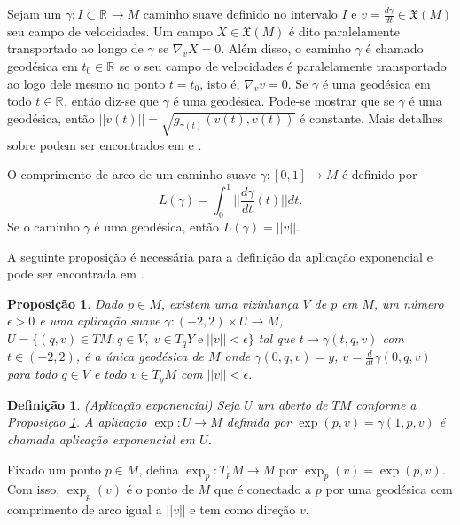 \documentclass[12pt]{book}
\newtheorem{definicao}[teorema]{Definição}
\newtheorem{proposicao}[teorema]{Proposição}
\newcommand{\campossuaves}[1]{\mathfrak{X}(#1)}
\newcommand{\derivada}[2]{\frac{d #1}{d #2}}
\newcommand{\espacotangenteponto}[2]{T_{#1}#2}
\newcommand{\intervalo}{[0,1]}
\newcommand{\norma}[1]{||#1||}
\newcommand{\normagrande}[1]{\Big|\Big|#1\Big|\Big|}
\newcommand{\real}[1]{\mathbb{R}^{#1}}
\newcommand{\reta}{\real{}}
\begin{document}
	Sejam um $\gamma:I\subset\reta\to M$ caminho suave definido no intervalo $I$ e $v=\derivada{\gamma}{t}\in \campossuaves{M}$ seu campo de velocidades. Um campo $X \in \campossuaves{M}$ é dito paralelamente transportado ao longo de $\gamma$ se $\nabla_{v}X=0$. Além disso, o caminho $\gamma$ é chamado geodésica em $t_{0} \in \reta$ se o seu campo de velocidades é paralelamente transportado ao logo dele mesmo no ponto $t=t_{0}$, isto é, $\nabla_{v}v=0$. Se $\gamma$ é uma geodésica em todo $t\in \reta$, então diz-se que $\gamma$ é uma geodésica. Pode-se mostrar que se $\gamma$ é uma geodésica, então $\norma{v(t)} = \sqrt{g_{\gamma(t)}(v(t), v(t))}$ é constante.
	Mais detalhes sobre podem ser encontrados em \cite{manfredo_riemannian_geo} e \cite{nakahara}.
	
	O comprimento de arco de um caminho suave $\gamma:\intervalo\to M$ é definido por 
	$$
	L(\gamma) =  \int_{0}^{1}\normagrande{\derivada{\gamma}{t}(t)}dt.
	$$
	Se o caminho $\gamma$ é uma geodésica, então $L(\gamma) =\norma{v}$.
	
	A seguinte proposição é necessária para a definição da aplicação exponencial e pode ser encontrada em \cite{manfredo_riemannian_geo}.
	
	\begin{proposicao}\label{proposicao_existencia_geodesica}
		Dado $p\in M$, existem uma vizinhança $V$ de $p$ em $M$, um número $\epsilon>0$ e uma aplicação suave $\gamma:(-2,2)\times U \to M$, $U=\{(q, v) \in TM: q\in V,\;v\in \espacotangenteponto{q}{Y}\;\text{e}\;\norma{v}<\epsilon \}$ tal que $t\mapsto \gamma(t, q, v)$ com $t\in (-2,2)$, é a única geodésica de $M$ onde $\gamma(0, q, v)=y$, $v=\derivada{}{t}\gamma(0,q,v)$ para todo $q\in V$ e todo $v\in \espacotangenteponto{y}{M}$ com $\norma{v}<\epsilon$.
	\end{proposicao}
	
	\begin{definicao}\label{definicao_aplicacao_exponencial}
		(Aplicação exponencial) Seja $U$ um aberto de $TM$ conforme a Proposição \ref{proposicao_existencia_geodesica}. A aplicação $\exp:U \to M$ definida por $\exp(p,v) = \gamma(1, p,v)$ é chamada aplicação exponencial em $U$.
	\end{definicao}
	
	Fixado um ponto $p \in M$, defina $\exp_{p}:T_{p}M \to M$ por $\exp_{p}(v) = \exp(p,v)$. Com isso, $\exp_{p}(v)$ é o ponto de $M$ que é conectado a $p$ por uma geodésica com comprimento de arco igual a $\norma{v}$ e tem como direção $v$.
	
\end{document}
